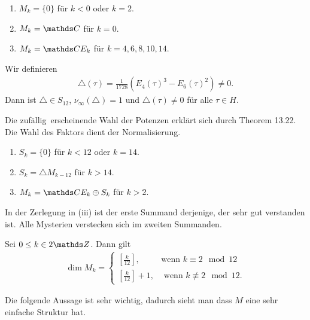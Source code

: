 \begin{prop}
\begin{enumerate}[label=(\roman*)]
\item $M_k=\{0\}$ für $k<0$ oder $k=2$.
\item $M_k=\C$ für $k=0$.
\item $M_k=\C E_k$ für $k=4,6,8,10,14$.
\end{enumerate}
\end{prop}

\begin{defi}
Wir definieren
\begin{align*}
\bigtriangleup(\tau)=\frac{1}{1728} (E_4(\tau)^3-E_6(\tau)^2)\not =0.
\end{align*}
Dann ist $\bigtriangleup\in S_{12}$, $\nu_\infty(\bigtriangleup)=1$ und $\bigtriangleup(\tau)\not=0$ für alle $\tau \in H$.
\end{defi}

Die \glqq zufällig\grqq\ erscheinende Wahl der Potenzen erklärt sich
durch Theorem 13.22.
Die Wahl des Faktors dient der Normalisierung.

\begin{prop}
\begin{enumerate}[label=(\roman*)]
\item $S_k=\{0\}$ für $k<12$ oder $k=14$.
\item $S_k=\bigtriangleup M_{k-12}$ für $k>14$.
\item $M_k=\C E_k\oplus S_k$ für $k>2$.
\end{enumerate}
\end{prop}

In der Zerlegung in (iii) ist der erste Summand derjenige, der sehr gut verstanden ist.
Alle Mysterien verstecken sich im zweiten Summanden.

\begin{prop}
Sei $0\leq k\in 2\Z$. Dann gilt
\begin{align*}
\dim M_k=\begin{cases}
\left[\frac{k}{12}\right],~~&\text{wenn } k \equiv 2 \mod 12\\
\left[\frac{k}{12}\right]+1,&\text{ wenn } k \not \equiv 2 \mod 12.
\end{cases}
\end{align*}
\end{prop}

Die folgende Aussage ist sehr wichtig, dadurch sieht man dass $M$
eine sehr einfache Struktur hat.

